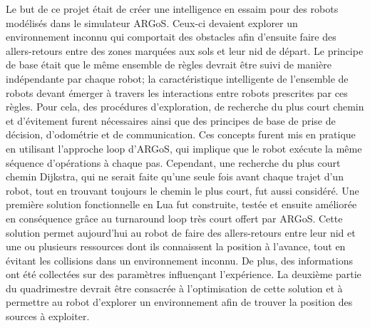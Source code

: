 Le but de ce projet était de créer une intelligence en essaim pour des robots modélisés dans le simulateur ARGoS. Ceux-ci devaient explorer un environnement inconnu qui comportait des obstacles afin d'ensuite faire des allers-retours entre des zones marquées aux sols et leur nid de départ. Le principe de base était que le même ensemble de règles devrait être suivi de manière indépendante par chaque robot; la caractéristique intelligente de l'ensemble de robots devant émerger à travers les interactions entre robots prescrites par ces règles. Pour cela, des procédures d'exploration, de recherche du plus court chemin et d'évitement furent nécessaires ainsi que des principes de base de prise de décision, d'odométrie et de communication. Ces concepts furent mis en pratique en utilisant l'approche loop d'ARGoS, qui implique que le robot exécute la même séquence d'opérations à chaque pas. Cependant, une recherche du plus court chemin Dijkstra, qui ne serait faite qu'une seule fois avant chaque trajet d'un robot, tout en trouvant toujours le chemin le plus court, fut aussi considéré. Une première solution fonctionnelle en Lua fut construite, testée et ensuite améliorée en conséquence grâce au turnaround loop très court offert par ARGoS. Cette solution permet aujourd'hui au robot de faire des allers-retours entre leur nid et une ou plusieurs ressources dont ils connaissent la position à l'avance, tout en évitant les collisions dans un environnement inconnu. De plus, des informations ont été collectées sur des paramètres influençant l'expérience. La deuxième partie du quadrimestre devrait être consacrée à l'optimisation de cette solution et à permettre au robot d'explorer un environnement afin de trouver la position des sources à exploiter. 